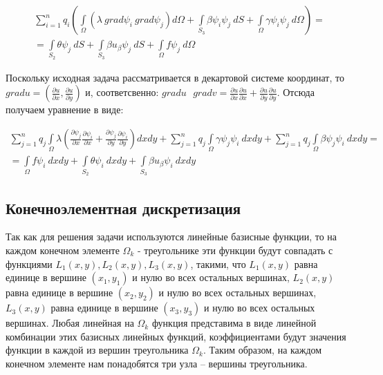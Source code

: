 \documentclass[12pt,a4paper]{article}
\begin{document}
\begin{eqnarray*}
    \sum \limits_{i=1}^n q_i \left(
        \int \limits_{\Omega} (\lambda \ grad \psi_i \ grad \psi_j) d\Omega
        + \int \limits_{S_3} \beta \psi_i \psi_j \ dS
        + \int \limits_{\Omega} \gamma \psi_i \psi_j \ d\Omega
    \right)
    = \\
    =
    \int \limits_{S_2} \theta \psi_j \ dS
    + \int \limits_{S_3} \beta u_{\beta} \psi_j \ dS
    + \int \limits_{\Omega} f \psi_j \ d\Omega
\end{eqnarray*}


\begin{spacing}{1.25}
    \noindent Поскольку исходная задача рассматривается в
    декартовой системе координат, то
    $grad u = \left( \frac{\partial u}{\partial x}, \frac{\partial u}{\partial y} \right)$
    и, соответсвенно:
    $
    grad u \text{ } grad v =
    \frac{\partial u}{\partial x}
    \frac{\partial u}{\partial x}
    +
    \frac{\partial u}{\partial y}
    \frac{\partial u}{\partial y}
    $.
    Отсюда получаем уравнение в виде:
\end{spacing}


\begin{eqnarray*}
    \sum \limits_{j=1}^n q_j \int \limits_{\Omega}
    \lambda \left(
        \frac{\partial \psi_j}{\partial x} \frac{\partial \psi_i}{\partial x}
        +
        \frac{\partial \psi_j}{\partial y} \frac{\partial \psi_i}{\partial y}
    \right)
    dxdy
    +
    \sum \limits_{j=1}^n q_j \int \limits_{\Omega}
    \gamma \psi_j \psi_i \ dxdy
    +
    \sum \limits_{j=1}^n q_j \int \limits_{\Omega}
    \beta \psi_j \psi_i \ dxdy
    = \\
    =
    \int \limits_{\Omega} f \psi_i \ dxdy
    +
    \int \limits_{S_2} \theta \psi_i \ dxdy
    +
    \int \limits_{S_3} \beta u_{\beta} \psi_i \ dxdy
\end{eqnarray*}


\subsection*{Конечноэлементная дискретизация}

Так как для решения задачи используются линейные базисные
функции, то на каждом конечном элементе $\Omega_k$ -
треугольнике эти функции будут совпадать с функциями
$L_1(x,y), L_2(x,y), L_3(x,y)$, такими, что $L_1(x,y)$
равна единице в вершине $(x_1,y_1)$ и нулю во всех остальных
вершинах, $L_2(x,y)$ равна единице в вершине $(x_2,y_2)$
и нулю во всех остальных вершинах, $L_3(x,y)$ равна единице
в вершине $(x_3,y_3)$ и нулю во всех остальных вершинах.
Любая линейная на $\Omega_k$ функция представима в виде
линейной комбинации этих базисных линейных функций,
коэффициентами будут значения функции в каждой из вершин
треугольника $\Omega_k$. Таким образом, на каждом конечном
элементе нам понадобятся три узла – вершины треугольника.
\end{document}

